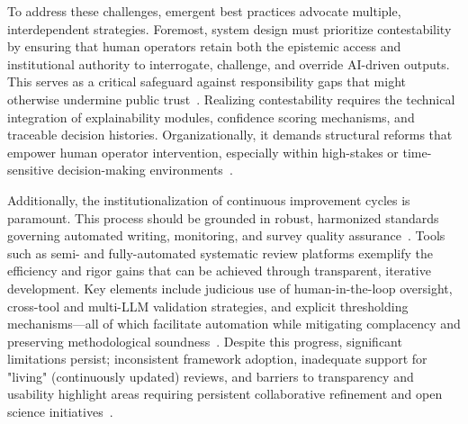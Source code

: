 \documentclass[sigconf]{acmart}
\begin{document}
To address these challenges, emergent best practices advocate multiple, interdependent strategies. Foremost, system design must prioritize contestability by ensuring that human operators retain both the epistemic access and institutional authority to interrogate, challenge, and override AI-driven outputs. This serves as a critical safeguard against responsibility gaps that might otherwise undermine public trust~\cite{ref97,ref98,ref100}. Realizing contestability requires the technical integration of explainability modules, confidence scoring mechanisms, and traceable decision histories. Organizationally, it demands structural reforms that empower human operator intervention, especially within high-stakes or time-sensitive decision-making environments~\cite{ref96,ref97,ref100,ref106}.

Additionally, the institutionalization of continuous improvement cycles is paramount. This process should be grounded in robust, harmonized standards governing automated writing, monitoring, and survey quality assurance~\cite{ref74,ref75,ref80,ref84,ref98,ref100,ref102,ref104,ref106}. Tools such as semi- and fully-automated systematic review platforms exemplify the efficiency and rigor gains that can be achieved through transparent, iterative development. Key elements include judicious use of human-in-the-loop oversight, cross-tool and multi-LLM validation strategies, and explicit thresholding mechanisms—all of which facilitate automation while mitigating complacency and preserving methodological soundness~\cite{ref74,ref80,ref84,ref100,ref102,ref104}. Despite this progress, significant limitations persist; inconsistent framework adoption, inadequate support for "living" (continuously updated) reviews, and barriers to transparency and usability highlight areas requiring persistent collaborative refinement and open science initiatives~\cite{ref75,ref80,ref104,ref106}.
\end{document}
